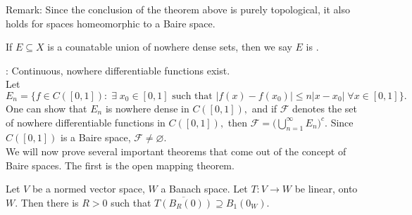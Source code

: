 \noindent *Remark: Since the conclusion of the theorem above is purely topological, it also holds for spaces homeomorphic to a Baire space.

\begin{defn}
If $E\subseteq X$ is a counatable union of nowhere dense sets, then we say $E$ is .
\end{defn}

\noindent{}: Continuous, nowhere differentiable functions exist. \\
Let $E_n=\{f\in C([0,1]):\;\exists\;x_0\in[0,1]\text{ such that } |f(x)-f(x_0)|\leq n|x-x_0|\;\forall x\in[0,1]\}.$ \\
One can show that $E_n$ is nowhere dense in $C([0,1]),$ and if $\mathcal{F}$ denotes the set of nowhere differentiable functions in $C([0,1]),$ then $\mathcal{F}=\Big(\bigcup_{n=1}^{\infty} E_n\Big)^c.$ Since $C([0,1])$ is a Baire space, $\mathcal{F}\neq\varnothing.$ \\


\noindent We will now prove several important theorems that come out of the concept of Baire spaces. The first is the open mapping theorem.

\begin{lemma}
Let $V$ be a normed vector space, $W$ a Banach space. Let $T:V\rightarrow W$ be linear, onto $W.$ Then there is $R>0$ such that $\overline{T(B_R(0))}\supseteq B_1(0_W).$ \\
\end{lemma}

